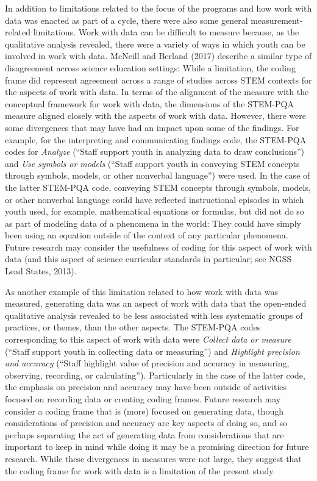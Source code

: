 \documentclass[]{book}
\theoremstyle{definition}
\theoremstyle{definition}
\theoremstyle{definition}
\theoremstyle{remark}
\begin{document}
In addition to limitations related to the focus of the programs and how
work with data was enacted as part of a cycle, there were also some
general measurement-related limitations. Work with data can be difficult
to measure because, as the qualitative analysis revealed, there were a
variety of ways in which youth can be involved in work with data.
McNeill and Berland (2017) describe a similar type of disagreement
across science education settings: While a limitation, the coding frame
did represent agreement across a range of studies across STEM contexts
for the aspects of work with data. In terms of the alignment of the
measure with the conceptual framework for work with data, the dimensions
of the STEM-PQA measure aligned closely with the aspects of work with
data. However, there were some divergences that may have had an impact
upon some of the findings. For example, for the interpreting and
communicating findings code, the STEM-PQA codes for \emph{Analyze}
(``Staff support youth in analyzing data to draw conclusions'') and
\emph{Use symbols or models} (``Staff support youth in conveying STEM
concepts through symbols, models, or other nonverbal language'') were
used. In the case of the latter STEM-PQA code, conveying STEM concepts
through symbols, models, or other nonverbal language could have
reflected instructional episodes in which youth used, for example,
mathematical equations or formulas, but did not do so as part of
modeling data of a phenomena in the world: They could have simply been
using an equation outside of the context of any particular phenomena.
Future research may consider the usefulness of coding for this aspect of
work with data (and this aspect of science curricular standards in
particular; see NGSS Lead States, 2013).

As another example of this limitation related to how work with data was
measured, generating data was an aspect of work with data that the
open-ended qualitative analysis revealed to be less associated with less
systematic groups of practices, or themes, than the other aspects. The
STEM-PQA codes corresponding to this aspect of work with data were
\emph{Collect data or measure} (``Staff support youth in collecting data
or measuring'') and \emph{Highlight precision and accuracy} (``Staff
highlight value of precision and accuracy in measuring, observing,
recording, or calculating''). Particularly in the case of the latter
code, the emphasis on precision and accuracy may have been outside of
activities focused on recording data or creating coding frames. Future
research may consider a coding frame that is (more) focused on
generating data, though considerations of precision and accuracy are key
aspects of doing so, and so perhaps separating the act of generating
data from considerations that are important to keep in mind while doing
it may be a promising direction for future research. While these
divergences in measures were not large, they suggest that the coding
frame for work with data is a limitation of the present study.
\end{document}
